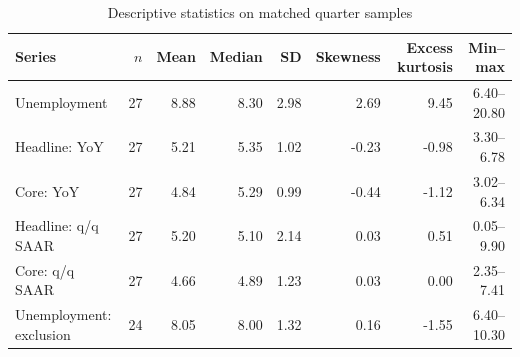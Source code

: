 \begin{table}[H]
\centering\small
\caption{Descriptive statistics on matched quarter samples}
\label{tab:descriptive}
\begin{tabular}{lrrrrrrr}
\toprule
Series & $n$ & Mean & Median & SD & Skewness & Excess kurtosis & Min--max\\
\midrule
Unemployment & 27 & 8.88 & 8.30 & 2.98 & 2.69 & 9.45 & 6.40--20.80\\
Headline: YoY & 27 & 5.21 & 5.35 & 1.02 & -0.23 & -0.98 & 3.30--6.78\\
Core: YoY & 27 & 4.84 & 5.29 & 0.99 & -0.44 & -1.12 & 3.02--6.34\\
Headline: q/q SAAR & 27 & 5.20 & 5.10 & 2.14 & 0.03 & 0.51 & 0.05--9.90\\
Core: q/q SAAR & 27 & 4.66 & 4.89 & 1.23 & 0.03 & 0.00 & 2.35--7.41\\
Unemployment: exclusion & 24 & 8.05 & 8.00 & 1.32 & 0.16 & -1.55 & 6.40--10.30\\
\bottomrule
\end{tabular}
\end{table}
